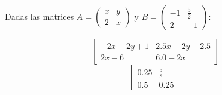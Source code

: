 \documentclass[addpoints,spanish, 12pt,a4paper]{exam}
\begin{document}
\begin{questions}
\question[4] Dadas las matrices $A=\left(\begin{matrix}x & y\\2 & x\end{matrix}\right)$ y 
$B=\left(\begin{matrix}-1 & \frac{5}{2}\\2 & -1\end{matrix}\right)
$:
\begin{solution}
    $$\left[\begin{matrix}- 2 x + 2 y + 1 & 2.5 x - 2 y - 2.5\\2 x - 6 & 6.0 - 2 x\end{matrix}\right]
$$
$$\left[\begin{matrix}0.25 & \frac{5}{8}\\0.5 & 0.25\end{matrix}\right]
$$
\end{solution}



\end{questions}
\end{document}
